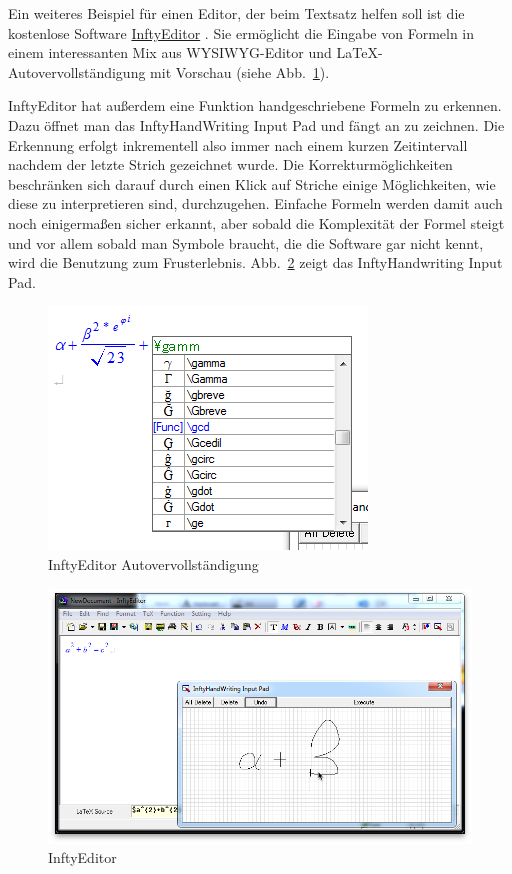 Ein weiteres Beispiel für einen Editor, der beim Textsatz helfen soll ist die kostenlose Software \href{http://www.inftyproject.org}{InftyEditor} \cite{Suzuki:2003p786}. Sie ermöglicht die Eingabe von Formeln in einem interessanten Mix aus \ac{WYSIWYG}-Editor und \LaTeX-Autovervollständigung mit Vorschau (siehe Abb.~\ref{fig:inftyeditor-autocomplete}). 

InftyEditor hat außerdem eine Funktion handgeschriebene Formeln zu erkennen. Dazu öffnet man das InftyHandWriting Input Pad und fängt an zu zeichnen. Die Erkennung erfolgt inkrementell also immer nach einem kurzen Zeitintervall nachdem der letzte Strich gezeichnet wurde. Die Korrekturmöglichkeiten beschränken sich darauf durch einen Klick auf Striche einige Möglichkeiten, wie diese zu interpretieren sind, durchzugehen. Einfache Formeln werden damit auch noch einigermaßen sicher erkannt, aber sobald die Komplexität der Formel steigt und vor allem sobald man Symbole braucht, die die Software gar nicht kennt, wird die Benutzung zum Frusterlebnis. Abb.~\ref{fig:inftyeditor} zeigt das InftyHandwriting Input Pad.

\begin{figure}[htbp]
  \begin{center}
    \includegraphics[width=.5\textwidth]{figures/inftyeditor-autocomplete.png}
  \end{center}
  \caption{InftyEditor Autovervollständigung}
  \label{fig:inftyeditor-autocomplete}
\end{figure}

\begin{figure}[htbp]
  \begin{center}
    \includegraphics[width=.8\textwidth]{figures/inftyeditor.png}
  \end{center}
  \caption{InftyEditor}
  \label{fig:inftyeditor}
\end{figure}

